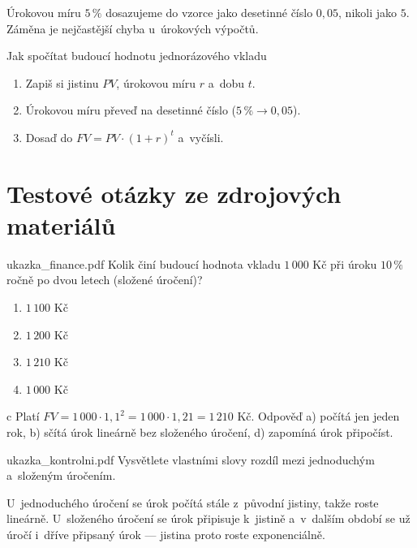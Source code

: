 \documentclass[11pt, a4paper, oneside]{book}
\begin{document}
\begin{pozor}
Úrokovou míru $5\,\%$ dosazujeme do vzorce jako desetinné číslo $0{,}05$,
nikoli jako $5$. Záměna je nejčastější chyba u~úrokových výpočtů.
\end{pozor}

\begin{kucharka}{Jak spočítat budoucí hodnotu jednorázového vkladu}
\begin{enumerate}
  \item Zapiš si jistinu $PV$, úrokovou míru $r$ a~dobu $t$.
  \item Úrokovou míru převeď na desetinné číslo ($5\,\% \to 0{,}05$).
  \item Dosaď do $FV = PV \cdot (1+r)^t$ a~vyčísli.
\end{enumerate}
\end{kucharka}

\section{Testové otázky ze zdrojových materiálů}

\begin{otazka}{ukazka\_finance.pdf}
Kolik činí budoucí hodnota vkladu $1\,000$ Kč při úroku $10\,\%$ ročně po
dvou letech (složené úročení)?
\begin{enumerate}[label=\alph*)]
  \item $1\,100$ Kč
  \item $1\,200$ Kč
  \item $1\,210$ Kč
  \item $1\,000$ Kč
\end{enumerate}
\end{otazka}
\begin{reseni}{c}
Platí $FV = 1\,000 \cdot 1{,}1^2 = 1\,000 \cdot 1{,}21 = 1\,210$ Kč.
Odpověď a) počítá jen jeden rok, b) sčítá úrok lineárně bez složeného
úročení, d) zapomíná úrok připočíst.
\end{reseni}

\begin{otazka}{ukazka\_kontrolni.pdf}
Vysvětlete vlastními slovy rozdíl mezi jednoduchým a~složeným úročením.
\end{otazka}
\begin{odpoved}
U~jednoduchého úročení se úrok počítá stále z~původní jistiny, takže roste
lineárně. U~složeného úročení se úrok připisuje k~jistině a~v~dalším období
se už úročí i~dříve připsaný úrok — jistina proto roste exponenciálně.
\end{odpoved}
\end{document}
